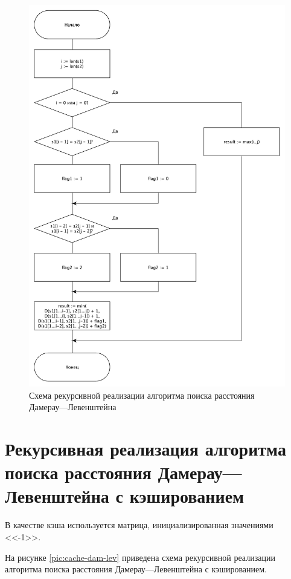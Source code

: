 \begin{figure}[H]
	\centering
	\includegraphics[scale=0.52]{assets/dam-lev-rec.pdf}
	\caption{Схема рекурсивной реализации алгоритма поиска расстояния Дамерау---Левенштейна}
	\label{pic:rec-dam-lev}
\end{figure}

\newpage

\section{Рекурсивная реализация алгоритма поиска расстояния Дамерау---Левенштейна с кэшированием}

В качестве кэша используется матрица, инициализированная значениями <<-1>>. 

На рисунке \ref{pic:cache-dam-lev} приведена схема рекурсивной реализации алгоритма поиска расстояния Дамерау---Левенштейна с кэшированием.

